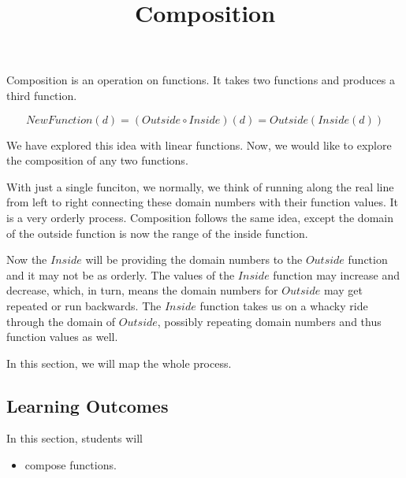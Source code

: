 \documentclass{ximera}
\title{Composition}
\begin{document}
\begin{abstract}
\end{abstract}
\maketitle













Composition is an operation on functions.  It takes two functions and produces a third function.


\[  NewFunction(d) = (Outside \circ Inside)(d) = Outside(Inside(d))    \]



We have explored this idea with linear functions.  Now, we would like to explore the composition of any two functions.






With just a single funciton, we normally, we think of running along the real line from left to right connecting these domain numbers with their function values.  It is a very orderly process.  Composition follows the same idea, except the domain of the outside function is now the range of the inside function.

Now the $Inside$ will be providing the domain numbers to the $Outside$ function and it may not be as orderly. The values of the $Inside$ function may increase and decrease, which, in turn, means the domain numbers for $Outside$ may get repeated or run backwards.   The $Inside$ function takes us on a whacky ride through the domain of $Outside$, possibly repeating domain numbers and thus function values as well.


In this section, we will map the whole process.










\subsection{Learning Outcomes}





\begin{sectionOutcomes}
In this section, students will 

\begin{itemize}
\item compose functions.
\end{itemize}
\end{sectionOutcomes}
\end{document}
